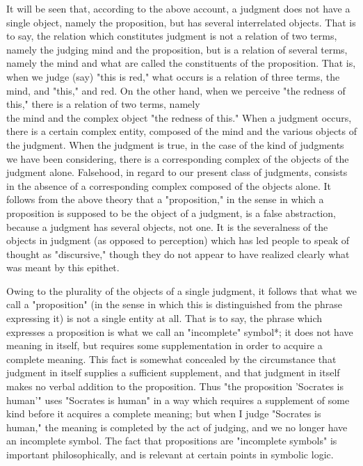 \documentclass[10pt]{article}
\begin{document}
It will be seen that, according to the above account, a judgment does not have a single object, namely the proposition, but has several interrelated objects. That is to say, the relation which constitutes judgment is not a relation of two terms, namely the judging mind and the proposition, but is a relation of several terms, namely the mind and what are called the constituents of the proposition. That is, when we judge (say) "this is red," what occurs is a relation of three terms, the mind, and "this," and red. On the other hand, when we perceive "the redness of this," there is a relation of two terms, namely\\
the mind and the complex object "the redness of this." When a judgment occurs, there is a certain complex entity, composed of the mind and the various objects of the judgment. When the judgment is true, in the case of the kind of judgments we have been considering, there is a corresponding complex of the objects of the judgment alone. Falsehood, in regard to our present class of judgments, consists in the absence of a corresponding complex composed of the objects alone. It follows from the above theory that a "proposition," in the sense in which a proposition is supposed to be the object of a judgment, is a false abstraction, because a judgment has several objects, not one. It is the severalness of the objects in judgment (as opposed to perception) which has led people to speak of thought as "discursive," though they do not appear to have realized clearly what was meant by this epithet.

Owing to the plurality of the objects of a single judgment, it follows that what we call a "proposition" (in the sense in which this is distinguished from the phrase expressing it) is not a single entity at all. That is to say, the phrase which expresses a proposition is what we call an "incomplete" symbol*; it does not have meaning in itself, but requires some supplementation in order to acquire a complete meaning. This fact is somewhat concealed by the circumstance that judgment in itself supplies a sufficient supplement, and that judgment in itself makes no verbal addition to the proposition. Thus "the proposition 'Socrates is human'" uses "Socrates is human" in a way which requires a supplement of some kind before it acquires a complete meaning; but when I judge "Socrates is human," the meaning is completed by the act of judging, and we no longer have an incomplete symbol. The fact that propositions are "incomplete symbols" is important philosophically, and is relevant at certain points in symbolic logic.
\end{document}
